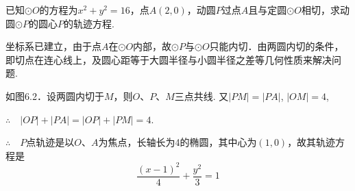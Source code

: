\begin{example}
    已知$\odot O$的方程为$x^2+y^2=16$，点$A(2,0)$，动圆$P$过点$A$且与定圆$\odot O$相切，求动圆$\odot P$的圆心$P$的轨迹方程.
\end{example}

\begin{analyze}
    坐标系已建立，由于点$A$在$\odot O$内部，故$\odot P$与$\odot O$只能内切．由两圆内切的条件，即切点在连心线上，及圆心距等于大圆半径与小圆半径之差等几何性质来解决问题.
\end{analyze}


\noindent
\begin{minipage}{.57\textwidth}
\CTEXindent
\begin{solution}
如图6.2．设两圆内切于$M$，则$O$、$P$、$M$三点共线. 又$|PM|=|PA|$, $|OM|=4$,

$\therefore\quad |OP|+|PA|=|OP|+|PM|=4$.

$\therefore\quad P$点轨迹是以$O$、$A$为焦点，长轴长为4的椭圆，其中心为$(1,0)$，故其轨迹方程是
\[\frac{(x-1)^2}{4}+\frac{y^2}{3}=1\]    
\end{solution}

\end{minipage}\hfill
\begin{minipage}{.4\textwidth}
    \centering
{}    
\end{minipage}

